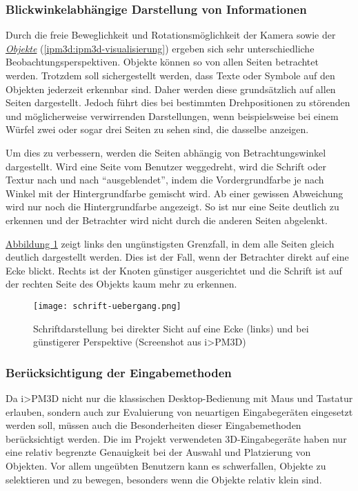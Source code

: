 \documentclass[a4paper,10pt]{sphinxmanual}
\begin{document}
\subsubsection{Blickwinkelabhängige Darstellung von Informationen}
\label{visualisierung:blickwinkelabhangige-darstellung-von-informationen}
Durch die freie Beweglichkeit und Rotationsmöglichkeit der Kamera sowie der {\hyperref[ipm3d:ipm3d-visualisierung]{\emph{Objekte}}} (\autoref*{ipm3d:ipm3d-visualisierung}) ergeben sich sehr unterschiedliche Beobachtungsperspektiven.
Objekte können so von allen Seiten betrachtet werden.
Trotzdem soll sichergestellt werden, dass Texte oder Symbole auf den Objekten jederzeit erkennbar sind. Daher werden diese grundsätzlich auf allen Seiten dargestellt.
Jedoch führt dies bei bestimmten Drehpositionen zu störenden und möglicherweise verwirrenden Darstellungen, wenn beispielsweise bei einem Würfel zwei oder sogar drei Seiten zu sehen sind, die dasselbe anzeigen.

Um dies zu verbessern, werden die Seiten abhängig von Betrachtungswinkel dargestellt.
Wird eine Seite vom Benutzer weggedreht, wird die Schrift oder Textur nach und nach "`ausgeblendet"', indem die Vordergrundfarbe je nach Winkel mit der Hintergrundfarbe gemischt wird.
Ab einer gewissen Abweichung wird nur noch die Hintergrundfarbe angezeigt. So ist nur eine Seite deutlich zu erkennen und der Betrachter wird nicht durch die anderen Seiten abgelenkt.

\hyperref[visualisierung:schrift-uebergang]{Abbildung  \ref*{visualisierung:schrift-uebergang}} zeigt links den ungünstigsten Grenzfall, in dem alle Seiten gleich deutlich dargestellt werden. Dies ist der Fall, wenn der Betrachter direkt auf eine Ecke blickt.
Rechts ist der Knoten günstiger ausgerichtet und die Schrift ist auf der rechten Seite des Objekts kaum mehr zu erkennen.
\begin{figure}[htbp]
\centering
\capstart

\texttt{[image: schrift-uebergang.png]}
\caption{Schriftdarstellung bei direkter Sicht auf eine Ecke (links) und bei günstigerer Perspektive (Screenshot aus i\textgreater{}PM3D)}\label{visualisierung:schrift-uebergang}\end{figure}


\subsubsection{Berücksichtigung der Eingabemethoden}
\label{visualisierung:berucksichtigung-der-eingabemethoden}
Da i\textgreater{}PM3D nicht nur die klassischen Desktop-Bedienung mit Maus und Tastatur erlauben, sondern auch zur Evaluierung von neuartigen Eingabegeräten eingesetzt werden soll, müssen auch die Besonderheiten dieser Eingabemethoden berücksichtigt werden.
Die im Projekt verwendeten 3D-Eingabegeräte \cite{buchi} haben nur eine relativ begrenzte Genauigkeit bei der Auswahl und Platzierung von Objekten.
Vor allem ungeübten Benutzern kann es schwerfallen, Objekte zu selektieren und zu bewegen, besonders wenn die Objekte relativ klein sind.
\end{document}
